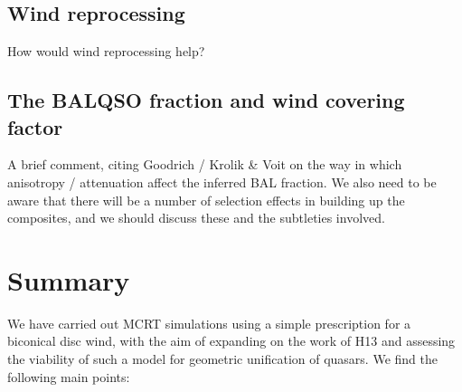 \documentclass[useAMS,usenatbib]{mn2e_x}
\begin{document}
\subsection{Wind reprocessing}

How would wind reprocessing help?

\subsection{The BALQSO fraction and wind covering factor}

A brief comment, citing Goodrich / Krolik \& Voit on the 
way in which anisotropy / attenuation affect the inferred
BAL fraction. We also need to be aware that there will be a number of selection
effects in building up the composites, and we should discuss these
and the subtleties involved. 





\newpage
\section{Summary}

We have carried out MCRT simulations using a simple
prescription for a biconical disc wind, with
the aim of expanding on the work of H13 and assessing 
the viability of such a model for geometric unification of quasars.
We find the following main points:
\end{document}
